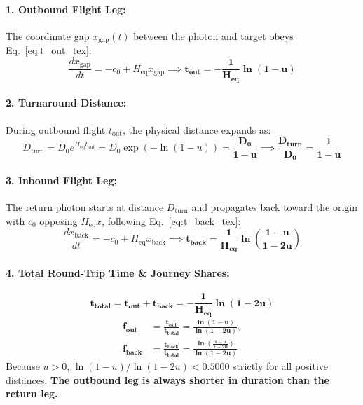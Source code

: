 \documentclass[11pt,a4paper]{article}
\begin{document}
\paragraph{1. Outbound Flight Leg:} The coordinate gap $x_{\text{gap}}(t)$ between the photon and target obeys Eq.~\eqref{eq:t_out_tex}:
\begin{equation}
\frac{d x_{\text{gap}}}{dt} = -c_0 + H_{\text{eq}} x_{\text{gap}} \implies \mathbf{t_{\text{out}} = -\frac{1}{H_{\text{eq}}} \ln(1 - u)}
\label{eq:t_out_tex}
\end{equation}

\paragraph{2. Turnaround Distance:} During outbound flight $t_{\text{out}}$, the physical distance expands as:
\begin{equation}
D_{\text{turn}} = D_0 e^{H_{\text{eq}} t_{\text{out}}} = D_0 \exp\left( -\ln(1 - u) \right) = \mathbf{\frac{D_0}{1 - u}} \implies \mathbf{\frac{D_{\text{turn}}}{D_0} = \frac{1}{1 - u}}
\end{equation}

\paragraph{3. Inbound Flight Leg:} The return photon starts at distance $D_{\text{turn}}$ and propagates back toward the origin with $c_0$ opposing $H_{\text{eq}} x$, following Eq.~\eqref{eq:t_back_tex}:
\begin{equation}
\frac{d x_{\text{back}}}{dt} = -c_0 + H_{\text{eq}} x_{\text{back}} \implies \mathbf{t_{\text{back}} = \frac{1}{H_{\text{eq}}} \ln\left(\frac{1 - u}{1 - 2u}\right)}
\label{eq:t_back_tex}
\end{equation}

\paragraph{4. Total Round-Trip Time \& Journey Shares:}
\begin{equation}
\mathbf{t_{\text{total}} = t_{\text{out}} + t_{\text{back}} = -\frac{1}{H_{\text{eq}}} \ln(1 - 2u)}
\end{equation}
\begin{equation}
\begin{aligned} \mathbf{f_{\text{out}}} &= \mathbf{\frac{t_{\text{out}}}{t_{\text{total}}} = \frac{\ln(1 - u)}{\ln(1 - 2u)}}, \\ \mathbf{f_{\text{back}}} &= \mathbf{\frac{t_{\text{back}}}{t_{\text{total}}} = \frac{\ln\left(\frac{1 - u}{1 - 2u}\right)}{\ln(1 - 2u)}} \end{aligned}
\end{equation}
Because $u > 0$, $\ln(1 - u) / \ln(1 - 2u) < 0.5000$ strictly for all positive distances. \textbf{The outbound leg is always shorter in duration than the return leg.}
\end{document}
